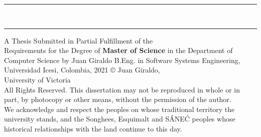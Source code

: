 \thispagestyle{empty}

\begingroup%
	\begin{center}
		\vfill
		\hrule
		\vspace{0.8cm}
		{\Huge\bfseries \thesistitle \\}
		\vspace{2cm}
		\hrule
		\vfill
		{A Thesis Submitted in Partial Fulfillment of the\\Requirements for the Degree of \mylinebreak}
		{\Large\bfseries Master of Science \mylinebreak}
		in the Department of Computer Science \mylinebreak
		{by \mylinebreak}
		{\Large Juan Giraldo \mylinebreak}
		{B.Eng. in Software Systems Engineering, Universidad Icesi, Colombia, 2021}
		\vfill
		\copyright{} Juan Giraldo, \the\year{}\\
		University of Victoria\\[3em]
		{\footnotesize All Rights Reserved. This dissertation may not be reproduced in whole or in part, by photocopy or other means, without the permission of the author.\\[0.5em]}
		{\footnotesize We acknowledge and respect the \lekwungen{} peoples on whose traditional territory the university stands, and the Songhees, Esquimalt and S\'{A}NE\'{C} peoples whose historical relationships with the land continue to this day.}
	\end{center}
\endgroup

\clearpage
